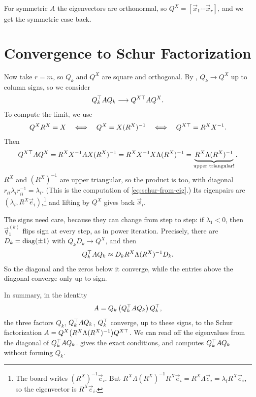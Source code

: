 For symmetric $A$ the eigenvectors are orthonormal, so $Q^X = [\vec{x}_1 \cdots \vec{x}_r]$, and we get the symmetric case back.

\section{Convergence to Schur Factorization}
\label{sec:orth-iter-schur}

Now take $r = m$, so $Q_k$ and $Q^X$ are square and orthogonal. By , $Q_k \to Q^X$ up to column signs, so we consider
\begin{equation}
  Q_k^\top AQ_k \longrightarrow Q^{X\top}AQ^X.
\end{equation}
To compute the limit, we use
\begin{equation}
  Q^XR^X = X \quad\Longleftrightarrow\quad Q^X = X(R^X)^{-1} \quad\Longleftrightarrow\quad Q^{X\top} = R^XX^{-1}.
\end{equation}
Then
\begin{equation}
  Q^{X\top}AQ^X = R^XX^{-1}AX(R^X)^{-1} = R^XX^{-1}X\Lambda(R^X)^{-1} = \underbrace{R^X\Lambda(R^X)^{-1}}_{\text{upper triangular!}}.
\end{equation}
$R^X$ and $(R^X)^{-1}$ are upper triangular, so the product is too, with diagonal $r_{ii}\lambda_ir_{ii}^{-1} = \lambda_i$. (This is the computation of \cref{eq:schur-from-eig}.) Its eigenpairs are $(\lambda_i, R^X\vec{e}_i)$,\footnote{The board writes $(R^X)^{-1}\vec{e}_i$. But $R^X\Lambda(R^X)^{-1}R^X\vec{e}_i = R^X\Lambda\vec{e}_i = \lambda_iR^X\vec{e}_i$, so the eigenvector is $R^X\vec{e}_i$.} and lifting by $Q^X$ gives back $\vec{x}_i$.

The signs need care, because they can change from step to step: if $\lambda_1 < 0$, then $\vec{q}_1^{(k)}$ flips sign at every step, as in power iteration. Precisely, there are $D_k = \operatorname{diag}(\pm 1)$ with $Q_kD_k \to Q^X$, and then
\begin{equation}
  Q_k^\top AQ_k \approx D_kR^X\Lambda(R^X)^{-1}D_k.
\end{equation}
So the diagonal and the zeros below it converge, while the entries above the diagonal converge only up to sign.

In summary, in the identity
\begin{equation}
  A = Q_k\,\bigl(Q_k^\top AQ_k\bigr)\,Q_k^\top,
\end{equation}
the three factors $Q_k$, $Q_k^\top AQ_k$, $Q_k^\top$ converge, up to these signs, to the Schur factorization $A = Q^X\bigl(R^X\Lambda(R^X)^{-1}\bigr)Q^{X\top}$. We can read off the eigenvalues from the diagonal of $Q_k^\top AQ_k$.  gives the exact conditions, and  computes $Q_k^\top AQ_k$ without forming $Q_k$.

